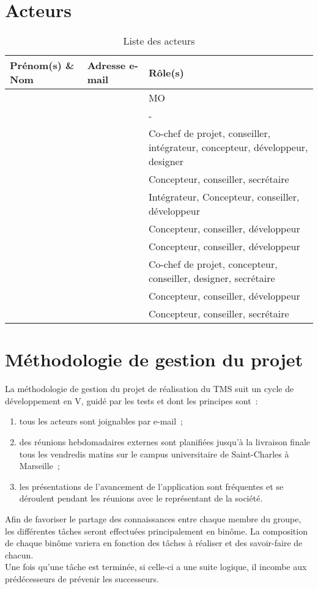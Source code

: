 \documentclass[11pt,fleqn]{report}
\begin{document}
\section{Acteurs}
\begin{table}[htbp]
	\begin{tabularx}{\linewidth}{X X X}
		\toprule
		\textbf{Prénom(s) \& Nom} & \textbf{Adresse e-mail} & \textbf{Rôle(s)} \\
		\midrule
		\Agopian & \AgopianEmail & MO \\
		\hline
		\Balde & \BaldeEmail & - \\
		\hline
		\Cadon & \CadonEmail & Co-chef de projet, conseiller, intégrateur, concepteur, développeur, designer \\
		\hline
		\Gairoard & \GairoardEmail & Concepteur, conseiller, secrétaire \\
		\hline
		\Julien & \JulienEmail & Intégrateur, Concepteur, conseiller, développeur \\
		\hline
		\Lericolais & \LericolaisEmail & Concepteur, conseiller, développeur \\
		\hline
		\Mezelle & \MezelleEmail & Concepteur, conseiller, développeur \\
		\hline
		\Pachy & \PachyEmail & Co-chef de projet, concepteur, conseiller, designer, secrétaire \\
		\hline
		\SuangaWeto & \SuangaWetoEmail & Concepteur, conseiller, développeur \\
		\hline
		\Toure & \ToureEmail & Concepteur, conseiller, secrétaire \\
		\bottomrule
	\end{tabularx}
	\caption{Liste des acteurs}
	\label{Acteurs}
\end{table}

\section{Méthodologie de gestion du projet}
La méthodologie de gestion du projet de réalisation du TMS suit un cycle de développement en V, guidé par les tests et dont les principes sont~:
\begin{enumerate}
	\item tous les acteurs sont joignables par e-mail~;
	\item des réunions hebdomadaires externes sont planifiées jusqu'à la livraison finale tous les vendredis matins sur le campus universitaire de Saint-Charles à Marseille~;
	\item les présentations de l'avancement de l'application sont fréquentes et se déroulent pendant les réunions avec le représentant de la société.
\end{enumerate}
Afin de favoriser le partage des connaissances entre chaque membre du groupe, les différentes tâches seront effectuées principalement en binôme. La composition de chaque binôme variera en fonction des tâches à réaliser et des savoir-faire de chacun.
\\
Une fois qu'une tâche est terminée, si celle-ci a une suite logique, il incombe aux prédécesseurs de prévenir les successeurs.
\end{document}
